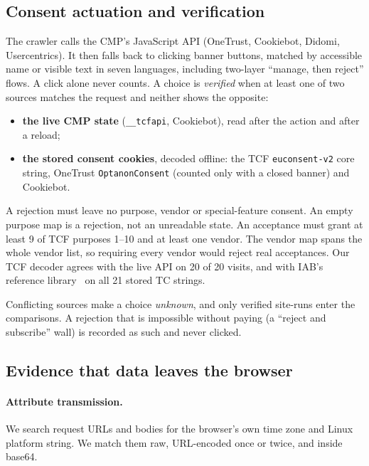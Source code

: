\documentclass[sigconf,review,anonymous]{acmart}
\begin{document}
\subsection{Consent actuation and verification}\label{sec:consent}
The crawler calls the CMP's JavaScript API (OneTrust, Cookiebot, Didomi, Usercentrics). It then
falls back to clicking banner buttons, matched by accessible name or visible text in seven
languages, including two-layer ``manage, then reject'' flows. A click alone never counts.
A choice is \emph{verified} when at least one of two sources matches the request and neither
shows the opposite:
\begin{itemize}
\item \textbf{the live CMP state} (\texttt{\_\_tcfapi}, Cookiebot), read after the action and
  after a reload;
\item \textbf{the stored consent cookies}, decoded offline: the TCF \texttt{euconsent-v2} core
  string, OneTrust \texttt{OptanonConsent} (counted only with a closed banner) and Cookiebot.
\end{itemize}
A rejection must leave no purpose, vendor or special-feature consent. An empty purpose map is a
rejection, not an unreadable state. An acceptance must grant at least 9 of TCF purposes 1--10
and at least one vendor. The vendor map spans the whole vendor list, so requiring every vendor
would reject real acceptances. Our TCF decoder agrees with the live API on 20 of 20 visits, and
with IAB's reference library~\cite{iabtcfcore} on all 21 stored TC strings.

Conflicting sources make a choice \emph{unknown}, and only verified site-runs enter the
comparisons. A rejection that is impossible without paying (a ``reject and subscribe'' wall)
is recorded as such and never clicked.

\subsection{Evidence that data leaves the browser}\label{sec:value}
\paragraph{Attribute transmission.} We search request URLs and bodies for the browser's own time
zone and Linux platform string. We match them raw, URL-encoded once or twice, and inside base64.
\end{document}
